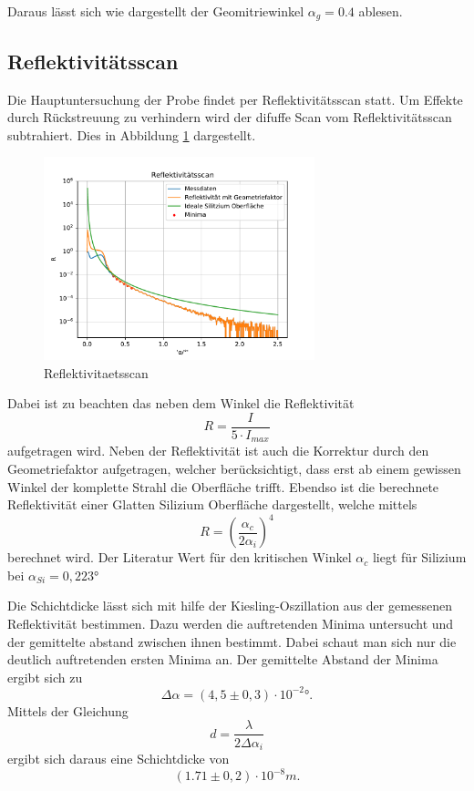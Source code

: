 Daraus lässt sich wie dargestellt der Geomitriewinkel $\alpha_g = 0.4$ ablesen.



\subsection{Reflektivitätsscan}
Die Hauptuntersuchung der Probe findet per Reflektivitätsscan statt.
Um Effekte durch Rückstreuung zu verhindern wird der difuffe Scan vom Reflektivitätsscan subtrahiert.
Dies in Abbildung \ref{fig:ref} dargestellt.
\begin{figure}[h]
    \centering
    \includegraphics[width = 0.7\textwidth]{Auswertung/Graphen/Reflektivitaetsscan.pdf}
    \caption{Reflektivitaetsscan}
    \label{fig:ref}
\end{figure}
Dabei ist zu beachten das neben dem Winkel die Reflektivität
\begin{equation*}
    R = \frac{I}{5\cdot I_{max}} 
\end{equation*}
aufgetragen wird.
Neben der Reflektivität ist auch die Korrektur durch den Geometriefaktor aufgetragen,
welcher berücksichtigt,
dass erst ab einem gewissen Winkel der komplette Strahl die Oberfläche trifft.
Ebendso ist die berechnete Reflektivität einer Glatten Silizium Oberfläche dargestellt,
welche mittels
\begin{equation}
    R = \left(\frac{\alpha_c}{2\alpha_i}\right)^4
\end{equation}
berechnet wird. 
Der Literatur Wert für den kritischen Winkel $\alpha_c$ liegt für Silizium bei $\alpha_{Si} = 0,223°$ \cite{wert}

Die Schichtdicke lässt sich mit hilfe der Kiesling-Oszillation aus der gemessenen Reflektivität bestimmen.
Dazu werden die auftretenden Minima untersucht und der gemittelte abstand zwischen ihnen bestimmt.
Dabei schaut man sich nur die deutlich auftretenden ersten Minima an.
Der gemittelte Abstand der Minima ergibt sich zu
\begin{equation}
    \Delta\alpha = (4,5 \pm 0,3)\cdot10^{-2}°.
\end{equation}
Mittels der Gleichung
\begin{equation}
    d = \frac{\lambda}{2\Delta\alpha_i}
\end{equation}
ergibt sich daraus eine Schichtdicke von
\begin{equation}
    (1.71 \pm 0,2)\cdot 10^{-8} m.
\end{equation}


